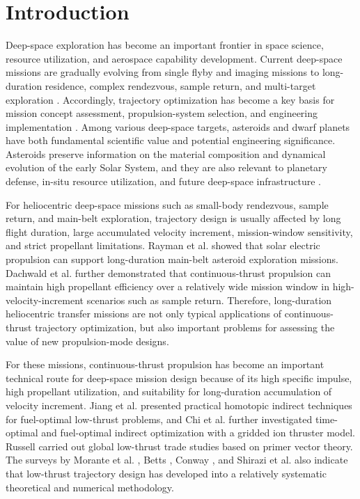 ﻿\documentclass{IEEEtaes}
\begin{document}
\section{Introduction}
Deep-space exploration has become an important frontier in space science, resource utilization, and aerospace capability development. Current deep-space missions are gradually evolving from single flyby and imaging missions to long-duration residence, complex rendezvous, sample return, and multi-target exploration \cite{racca2003}. Accordingly, trajectory optimization has become a key basis for mission concept assessment, propulsion-system selection, and engineering implementation \cite{vasile2006}. Among various deep-space targets, asteroids and dwarf planets have both fundamental scientific value and potential engineering significance. Asteroids preserve information on the material composition and dynamical evolution of the early Solar System, and they are also relevant to planetary defense, in-situ resource utilization, and future deep-space infrastructure \cite{azadmanesh2023}.

For heliocentric deep-space missions such as small-body rendezvous, sample return, and main-belt exploration, trajectory design is usually affected by long flight duration, large accumulated velocity increment, mission-window sensitivity, and strict propellant limitations. Rayman et al. \cite{rayman2006} showed that solar electric propulsion can support long-duration main-belt asteroid exploration missions. Dachwald et al. \cite{dachwald2008} further demonstrated that continuous-thrust propulsion can maintain high propellant efficiency over a relatively wide mission window in high-velocity-increment scenarios such as sample return. Therefore, long-duration heliocentric transfer missions are not only typical applications of continuous-thrust trajectory optimization, but also important problems for assessing the value of new propulsion-mode designs.

For these missions, continuous-thrust propulsion has become an important technical route for deep-space mission design because of its high specific impulse, high propellant utilization, and suitability for long-duration accumulation of velocity increment. Jiang et al. \cite{jiang2012} presented practical homotopic indirect techniques for fuel-optimal low-thrust problems, and Chi et al. \cite{chi2022} further investigated time-optimal and fuel-optimal indirect optimization with a gridded ion thruster model. Russell \cite{russell2007} carried out global low-thrust trade studies based on primer vector theory. The surveys by Morante et al. \cite{morante2021}, Betts \cite{betts1998}, Conway \cite{conway2012}, and Shirazi et al. \cite{shirazi2018} also indicate that low-thrust trajectory design has developed into a relatively systematic theoretical and numerical methodology.
\end{document}
